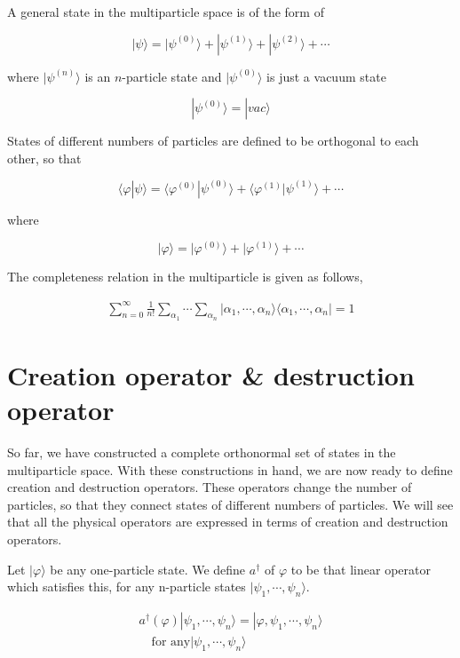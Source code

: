A general state in the multiparticle space is of the form of 

\[|\psi\rangle = |\psi^{(0)}\rangle + |\psi^{(1)}\rangle + |\psi^{(2)}\rangle + \cdots \]

where $|\psi^{(n)}\rangle$ is an $n$-particle state and $|\psi^{(0)}\rangle$ is just a vacuum state

\[|\psi^{(0)}\rangle = |vac\rangle \]

States of different numbers of particles are defined to be orthogonal to each other, so that

\[\langle\varphi|\psi\rangle = \langle\varphi^{(0)}|\psi^{(0)}\rangle + \langle\varphi^{(1)}|\psi^{(1)}\rangle + \cdots \]

where

\[|\varphi\rangle = |\varphi^{(0)}\rangle + |\varphi^{(1)}\rangle + \cdots \]

The completeness relation in the multiparticle is given as follows, 

\begin{align}
\sum_{n=0}^{\infty}\frac{1}{n!}\sum_{\alpha_1}\cdots\sum_{\alpha_n}|\alpha_1,\cdots,\alpha_n\rangle\langle \alpha_1,\cdots,\alpha_n| = 1
\end{align}



\section{Creation operator \& destruction operator}

So far, we have constructed a complete orthonormal set of states in the multiparticle space. With these constructions in hand, we are now ready to define creation and destruction operators. These operators change the number of particles, so that they connect states of different numbers of particles. We will see that all the physical operators are expressed in terms of creation and destruction operators. 

Let $|\varphi\rangle$ be any one-particle state. We define $a^\dagger$ of $\varphi$ to be that linear operator which satisfies this, for any n-particle states $|\psi_1, \cdots,\psi_n\rangle$. 

\begin{align}
a^\dagger(\varphi)|\psi_1,\cdots,\psi_n\rangle = |\varphi,\psi_1,\cdots,\psi_n\rangle \tag{e}\\
\quad\text{for any}|\psi_1,\cdots,\psi_n\rangle \label{Eqs1.6.1}
\end{align}

